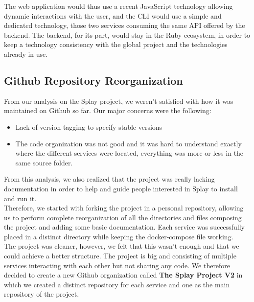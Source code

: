 \documentclass{eplmastersthesis}
\begin{document}
        The web application would thus use a recent JavaScript technology
        allowing dynamic interactions with the user, and the CLI would use
        a simple and dedicated technology, those two services consuming the
        same API offered by the backend. The backend, for its part, would
        stay in the Ruby ecosystem, in order to keep a technology consistency
        with the global project and the technologies already in use.

      \subsection{Github Repository Reorganization}

        From our analysis on the Splay project, we weren't satisfied with how
        it was maintained on Github so far. Our major concerns were the
        following:

        \begin{itemize}
          \item Lack of version tagging to specify stable versions
          \item The code organization was not good and it was hard to
          understand exactly where the different services were located,
          everything was more or less in the same source folder.
        \end{itemize}

        From this analysis, we also realized that the project was really
        lacking documentation in order to help and guide people interested
        in Splay to install and run it.\\

        Therefore, we started with forking the project in a personal repository,
        allowing us to perform complete reorganization of all the directories
        and files composing the project and adding some basic documentation.
        Each service was successfully placed in a distinct directory while
        keeping the docker-compose file working.\\
        The project was cleaner, however, we felt that this wasn't enough
        and that we could achieve a better structure. The project is big and
        consisting of multiple services interacting with each other but
        not sharing any code. We therefore decided to create a new Github
        organization called \textbf{The Splay Project V2} in which we created
        a distinct repository for each service and one as the main repository
        of the project.\\
\end{document}
